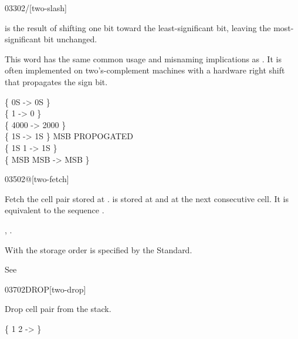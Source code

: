 \begin{worddef}{0330}{2/}[two-slash]
\item {}

	 is the result of shifting  one bit toward
	the least-significant bit, leaving the most-significant bit
	unchanged.

	\begin{defer}
	\rationale %
		This word has the same common usage and misnaming implications
		as . It is often implemented on two's-complement
		machines with a hardware right shift that propagates the sign
		bit.

	\testing
		\{ 0S		 -> 0S \} \\
		\{ 1		 -> 0 \} \\
		\{ 4000		 -> 2000 \} \\
		\{ 1S		 -> 1S \} \tab[4]  MSB PROPOGATED \\
		\{ 1S 1   -> 1S \} \\
		\{ MSB  MSB  -> MSB \}
	\end{defer}
\end{worddef}


\begin{worddef}{0350}{2@}[two-fetch]
\item {}

	Fetch the cell pair  stored at \param{a-addr}.
	 is stored at  and  at the
	next consecutive cell. It is equivalent to the sequence
	    \word{@}.

\see {},
	\wref{core:2!}{2!}.

	\begin{defer}
	\rationale %
		With  the storage order is specified by the Standard.

	\testing*
		See \rref{core:,}{,}
	\end{defer}
\end{worddef}


\begin{worddef}{0370}{2DROP}[two-drop]
\item {}

	Drop cell pair  from the stack.

	\begin{defer}
	\testing
		\{ 1 2  -> \}
	\end{defer}
\end{worddef}


